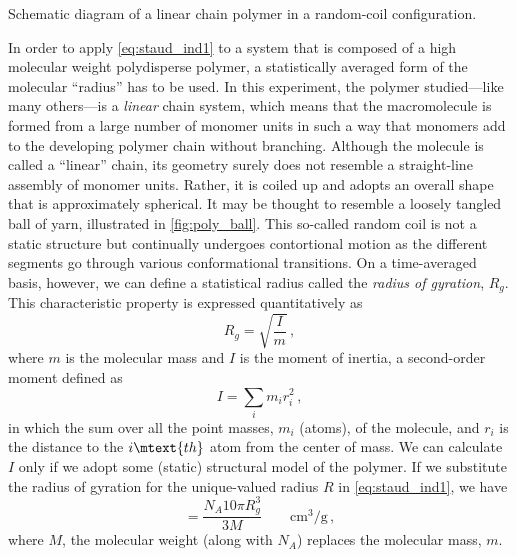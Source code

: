 \documentclass[nobib,nofonts,nols,nohyper]{tufte-handout}
\begin{document}
\begin{marginfigure}
	\caption{Schematic diagram of a linear chain polymer in a random-coil configuration.}
	\label{fig:poly_ball}
\end{marginfigure}
In order to apply \cref{eq:staud_ind1} to a system that is composed of a high molecular weight polydisperse polymer, a statistically averaged form of the molecular ``radius'' has to be used. 
In this experiment, the polymer studied---like many others---is a \emph{linear} chain system, which means that the macromolecule is formed from a large number of monomer units in such a way that monomers add to the developing polymer chain without branching. 
Although the molecule is called a ``linear'' chain, its geometry surely does not resemble a straight-line assembly of monomer units. 
Rather, it is coiled up and adopts an overall shape that is approximately spherical. It may be thought to resemble a loosely tangled ball of yarn, illustrated in \cref{fig:poly_ball}.
This so-called random coil is not a static structure but continually undergoes contortional motion as the different segments go through various conformational transitions. 
On a time-averaged basis, however, we can define a statistical radius called the \emph{radius of gyration}, \( R_g \). 
This characteristic property is expressed quantitatively as
\begin{equation}
	R_g = \sqrt{\frac{I}{m}} \, ,
	\label{eq:rad_gyr}
\end{equation}
where \( m \) is the molecular mass and \( I \) is the moment of inertia, a second-order moment defined as
\begin{equation}
	I = \sum_i m_i r_i^2 \, ,
	\label{eq:mom_inert}
\end{equation}
in which the sum over all the point masses, \( m_i \) (atoms), of the molecule, and \( r_i \) is the distance to the \( i\mtext{th} \) atom from the center of mass. 
We can calculate \( I \) only if we adopt some (static) structural model of the polymer. 
If we substitute the radius of gyration for the unique-valued radius \( R \) in \cref{eq:staud_ind1}, we have
\begin{equation}
	[\eta] = \frac{N_A 10 \pi R_g^3}{3 M} \qquad \unit{\cm\cubed \per \g} \, ,
	\label{eq:staud_ind2}
\end{equation}
where \( M \), the molecular weight (along with \( N_A \)) replaces the molecular mass, \( m \).
\end{document}
